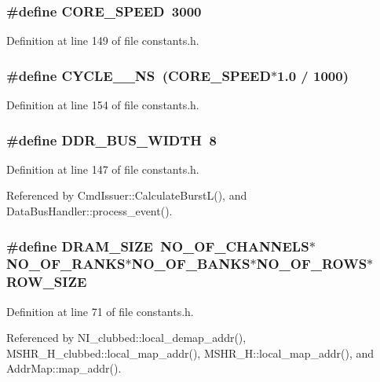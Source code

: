 \subsubsection[{CORE\_\-SPEED}]{\setlength{\rightskip}{0pt plus 5cm}\#define CORE\_\-SPEED~3000}\label{constants_8h_17f67d81ec6ca63acdd9ffa7fed8a503}




Definition at line 149 of file constants.h.
\subsubsection[{CYCLE\_\-2\_\-NS}]{\setlength{\rightskip}{0pt plus 5cm}\#define CYCLE\_\_\-NS~(CORE\_\-SPEED$\ast$1.0 / 1000)}\label{constants_8h_e1ab38102bb8953580ddb7d8e1ed4749}




Definition at line 154 of file constants.h.
\subsubsection[{DDR\_\-BUS\_\-WIDTH}]{\setlength{\rightskip}{0pt plus 5cm}\#define DDR\_\-BUS\_\-WIDTH~8}\label{constants_8h_09c4492c4f9e8f1fc3cce094d15cffcb}




Definition at line 147 of file constants.h.

Referenced by CmdIssuer::CalculateBurstL(), and DataBusHandler::process\_\-event().
\subsubsection[{DRAM\_\-SIZE}]{\setlength{\rightskip}{0pt plus 5cm}\#define DRAM\_\-SIZE~NO\_\-OF\_\-CHANNELS$\ast$NO\_\-OF\_\-RANKS$\ast$NO\_\-OF\_\-BANKS$\ast$NO\_\-OF\_\-ROWS$\ast$ROW\_\-SIZE}\label{constants_8h_4e35909b44ea391fbb7bb146992bb84d}




Definition at line 71 of file constants.h.

Referenced by NI\_\-clubbed::local\_\-demap\_\-addr(), MSHR\_\-H\_\-clubbed::local\_\-map\_\-addr(), MSHR\_\-H::local\_\-map\_\-addr(), and AddrMap::map\_\-addr().
